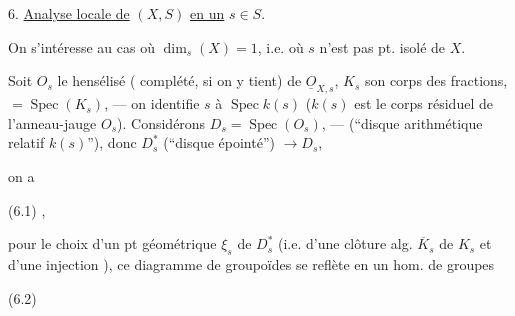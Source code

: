 6. \uline{Analyse locale de} $(X,S)$ \uline{en un} $s\in S$.

On s'intéresse au cas où $\dim_s(X)=1$, i.e. où $s$ n'est pas pt.
isolé de $X$.

Soit $O_s$ le hensélisé ( complété, si on y tient)
de $\underline{O}_{X,s}$, $K_s$ son corps des fractions,
$=\operatorname{Spec}(K_s)$, --- on identifie $s$ à
$\operatorname{Spec} k(s)$ ($k(s)$ est le corps résiduel de
l'anneau-jauge $O_s$). Considérons
$D_s=\operatorname{Spec}(O_s)$, ---
(``disque arithmétique relatif  $k(s)$''), donc
$D_s^*$ 
(``disque épointé'') $\longrightarrow D_s$,



on a

(6.1)
,

pour le choix d'un pt géométrique $\xi_s$ de $D_s^*$
 (i.e. d'une clôture alg.
$\overline K_s$ de $K_s$ et d'une injection
),
ce diagramme de groupoïdes se reflète en un hom. de groupes

(6.2)


